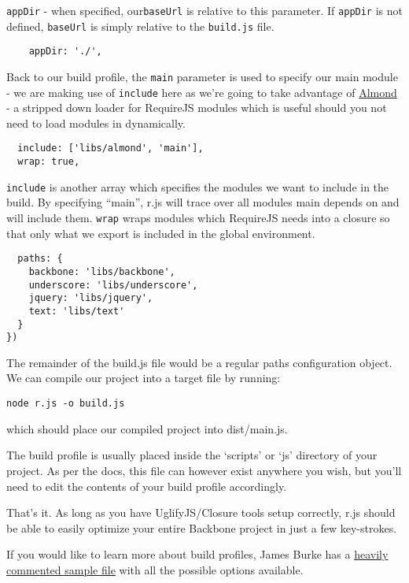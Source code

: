 \documentclass[9pt]{book}
\begin{document}
\texttt{appDir} - when specified, our\texttt{baseUrl} is relative to
this parameter. If \texttt{appDir} is not defined, \texttt{baseUrl} is
simply relative to the \texttt{build.js} file.

\begin{verbatim}
    appDir: './',
\end{verbatim}

Back to our build profile, the \texttt{main} parameter is used to
specify our main module - we are making use of \texttt{include} here as
we're going to take advantage of
\href{https://github.com/jrburke/almond}{Almond} - a stripped down
loader for RequireJS modules which is useful should you not need to load
modules in dynamically.

\begin{verbatim}
  include: ['libs/almond', 'main'],
  wrap: true,
\end{verbatim}

\texttt{include} is another array which specifies the modules we want to
include in the build. By specifying ``main'', r.js will trace over all
modules main depends on and will include them. \texttt{wrap} wraps
modules which RequireJS needs into a closure so that only what we export
is included in the global environment.

\begin{verbatim}
  paths: {
    backbone: 'libs/backbone',
    underscore: 'libs/underscore',
    jquery: 'libs/jquery',
    text: 'libs/text'
  }
})
\end{verbatim}

The remainder of the build.js file would be a regular paths
configuration object. We can compile our project into a target file by
running:

\begin{verbatim}
node r.js -o build.js
\end{verbatim}

which should place our compiled project into dist/main.js.

The build profile is usually placed inside the `scripts' or `js'
directory of your project. As per the docs, this file can however exist
anywhere you wish, but you'll need to edit the contents of your build
profile accordingly.

That's it. As long as you have UglifyJS/Closure tools setup correctly,
r.js should be able to easily optimize your entire Backbone project in
just a few key-strokes.

If you would like to learn more about build profiles, James Burke has a
\href{https://github.com/jrburke/r.js/blob/master/build/example.build.js}{heavily
commented sample file} with all the possible options available.
\end{document}
